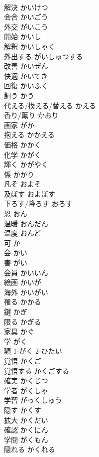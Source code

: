 \documentclass[8pt]{extreport}
\begin{document}
\begin{CJK}{UTF8}{min}
\\	解決	かいけつ	
\\	会合	かいごう	
\\	外交	がいこう	
\\	開始	かいし	
\\	解釈	かいしゃく	
\\	外出する	がいしゅつする	
\\	改善	かいぜん	
\\	快適	かいてき	
\\	回復	かいふく	
\\	飼う	かう	
\\	代える/換える/替える	かえる	
\\	香り/薫り	かおり	
\\	画家	がか	
\\	抱える	かかえる	
\\	価格	かかく	
\\	化学	かがく	
\\	輝く	かがやく	
\\	係	かかり	
\\	凡そ	およそ	
\\	及ぼす	およぼす	
\\	下ろす/降ろす	おろす	
\\	恩	おん	
\\	温暖	おんだん	
\\	温度	おんど	
\\	可	か	
\\	会	かい	
\\	害	がい	
\\	会員	かいいん	
\\	絵画	かいが	
\\	海外	かいがい	
\\	罹る	かかる	
\\	鍵	かぎ	
\\	限る	かぎる	
\\	家具	かぐ	
\\	学	がく	
\\	額	1-がく 2-ひたい	
\\	覚悟	かくご	
\\	覚悟する	かくごする	
\\	確実	かくじつ	
\\	学者	がくしゃ	
\\	学習	がっくしゅう	
\\	隠す	かくす	
\\	拡大	かくだい	
\\	確認	かくにん	
\\	学問	がくもん	
\\	隠れる	かくれる	

\end{CJK}
\end{document}

